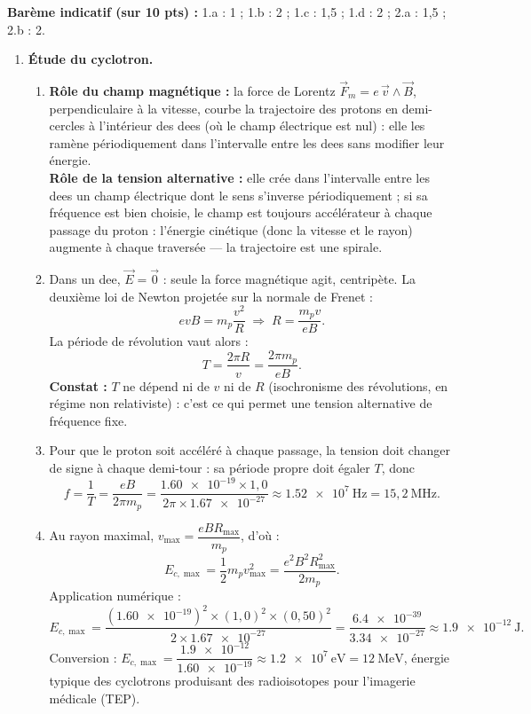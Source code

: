 \documentclass[11pt]{article}
\begin{document}
\begin{corrige}
\textbf{Barème indicatif (sur 10 pts) :} 1.a : 1 ; 1.b : 2 ; 1.c : 1,5 ; 1.d : 2 ; 2.a : 1,5 ; 2.b : 2.

\begin{enumerate}
\item \textbf{Étude du cyclotron.}
\begin{enumerate}
\item \textbf{Rôle du champ magnétique :} la force de Lorentz $\vec{F}_m = e\,\vec{v}\wedge\vec{B}$, perpendiculaire à la vitesse, courbe la trajectoire des protons en demi-cercles à l'intérieur des dees (où le champ électrique est nul) : elle les ramène périodiquement dans l'intervalle entre les dees sans modifier leur énergie.\\
\textbf{Rôle de la tension alternative :} elle crée dans l'intervalle entre les dees un champ électrique dont le sens s'inverse périodiquement ; si sa fréquence est bien choisie, le champ est toujours accélérateur à chaque passage du proton : l'énergie cinétique (donc la vitesse et le rayon) augmente à chaque traversée — la trajectoire est une spirale.
\item Dans un dee, $\vec{E} = \vec{0}$ : seule la force magnétique agit, centripète. La deuxième loi de Newton projetée sur la normale de Frenet :
\[
evB = m_p\frac{v^2}{R} \;\Longrightarrow\; R = \frac{m_p v}{eB}.
\]
La période de révolution vaut alors :
\[
T = \frac{2\pi R}{v} = \boxed{\frac{2\pi m_p}{eB}}.
\]
\textbf{Constat :} $T$ ne dépend ni de $v$ ni de $R$ (isochronisme des révolutions, en régime non relativiste) : c'est ce qui permet une tension alternative de fréquence fixe.
\item Pour que le proton soit accéléré à chaque passage, la tension doit changer de signe à chaque demi-tour : sa période propre doit égaler $T$, donc
\[
f = \frac{1}{T} = \frac{eB}{2\pi m_p} = \frac{\num{1,60e-19}\times 1,0}{2\pi\times\num{1,67e-27}} \approx \num{1,52e7}~\mathrm{Hz} = 15,2~\mathrm{MHz}.
\]
\item Au rayon maximal, $v_{\max} = \dfrac{eBR_{\max}}{m_p}$, d'où :
\[
E_{c,\max} = \frac{1}{2}m_p v_{\max}^2 = \boxed{\frac{e^2B^2R_{\max}^2}{2m_p}}.
\]
Application numérique :
\[
E_{c,\max} = \frac{(\num{1,60e-19})^2\times(1,0)^2\times(0,50)^2}{2\times\num{1,67e-27}} = \frac{\num{6,4e-39}}{\num{3,34e-27}} \approx \num{1,9e-12}~\mathrm{J}.
\]
Conversion : $E_{c,\max} = \dfrac{\num{1,9e-12}}{\num{1,60e-19}} \approx \num{1,2e7}~\mathrm{eV} = 12~\mathrm{MeV}$, énergie typique des cyclotrons produisant des radioisotopes pour l'imagerie médicale (TEP).

\end{enumerate}
\end{enumerate}
\end{corrige}
\end{document}
